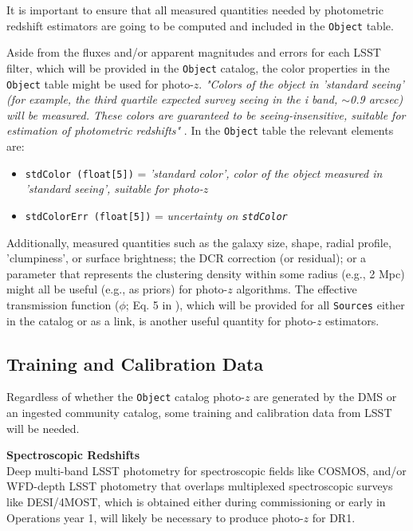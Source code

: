 \documentclass[DM,lsstdraft,toc]{lsstdoc}
\begin{document}
It is important to ensure that all measured quantities needed by photometric redshift estimators are going to be computed and included in the {\tt Object} table. 

Aside from the fluxes and/or apparent magnitudes and errors for each LSST filter, which will be provided in the {\tt Object} catalog, the color properties in the {\tt Object} table might be used for photo-$z$. {\it "Colors of the object in 'standard seeing' (for example, the third quartile expected survey seeing in the i band, $\sim$0.9 arcsec) will be measured. These colors are guaranteed to be seeing-insensitive, suitable for estimation of photometric redshifts"} . In the {\tt Object} table the relevant elements are:
\vspace{-15pt}
\begin{itemize}
\item \texttt{stdColor (float[5])} = {\it 'standard color', color of the object measured in 'standard seeing', suitable for photo-$z$}
\item \texttt{stdColorErr (float[5])} = {\it uncertainty on \texttt{stdColor}}
\end{itemize}

Additionally, measured quantities such as the galaxy size, shape, radial profile, 'clumpiness', or surface brightness; the DCR correction (or residual); or a parameter that represents the clustering density within some radius (e.g., 2 Mpc) might all be useful (e.g., as priors) for photo-$z$ algorithms. The effective transmission function ($\phi$; Eq. 5 in ), which will be provided for all {\tt Sources} either in the catalog or as a link, is another useful quantity for photo-$z$ estimators.


\subsection{Training and Calibration Data}\label{ssec:dp_calib}

Regardless of whether the {\tt Object} catalog photo-$z$ are generated by the DMS or an ingested community catalog, some training and calibration data from LSST will be needed.

{\bf Spectroscopic Redshifts}\\
Deep multi-band LSST photometry for spectroscopic fields like COSMOS, and/or WFD-depth LSST photometry that overlaps multiplexed spectroscopic surveys like DESI/4MOST, which is obtained either during commissioning or early in Operations year 1, will likely be necessary to produce photo-$z$ for DR1.
\end{document}
